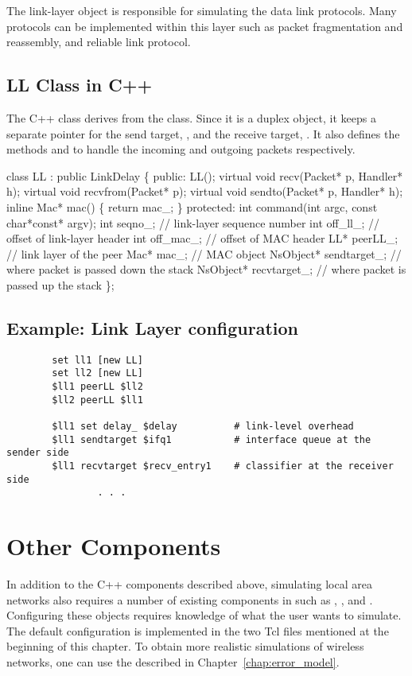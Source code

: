 The link-layer object is responsible for simulating the data link
protocols.  Many protocols can be implemented within this layer such as
packet fragmentation and reassembly, and reliable link protocol.

\subsection{LL Class in C++}
\label{sec:llcplus}

The C++ class  derives from the  class.  Since
it is a duplex object, it keeps a separate pointer for the send target,
, and the receive target, .  It also
defines the methods  and  to handle the
incoming and outgoing packets respectively.

\begin{program}
   class LL : public LinkDelay \{
   public:
        LL();
        virtual void recv(Packet* p, Handler* h);
        virtual void recvfrom(Packet* p);
        virtual void sendto(Packet* p, Handler* h);
        inline Mac* mac() \{ return mac_; \}
   protected:
        int command(int argc, const char*const* argv);
        int seqno_;		// link-layer sequence number
        int off_ll_;		// offset of link-layer header
        int off_mac_;		// offset of MAC header
        LL* peerLL_;		// link layer of the peer
        Mac* mac_;		// MAC object
        NsObject* sendtarget_;	// where packet is passed down the stack
        NsObject* recvtarget_;	// where packet is passed up the stack
   \};
\end{program}

\subsection{Example: Link Layer configuration}
\label{ex:linklayer}

\begin{verbatim}
        set ll1 [new LL]
        set ll2 [new LL]
        $ll1 peerLL $ll2
        $ll2 peerLL $ll1

        $ll1 set delay_ $delay          # link-level overhead
        $ll1 sendtarget $ifq1           # interface queue at the sender side
        $ll1 recvtarget $recv_entry1    # classifier at the receiver side
                . . .
\end{verbatim}


\section{Other Components}
\label{sec:lan_others}

In addition to the C++ components described above, simulating local area
networks also requires a number of existing components in \ns such as
, , and .  Configuring these
objects requires knowledge of what the user wants to simulate.  The
default configuration is implemented in the two Tcl files mentioned at
the beginning of this chapter.  To obtain more realistic simulations of
wireless networks, one can use the  described in 
Chapter~\ref{chap:error_model}.

%
\endinput
